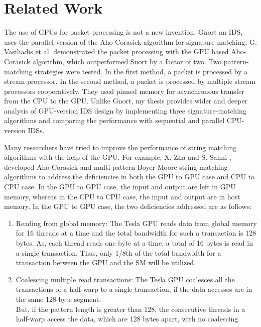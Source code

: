 \chapter{Related Work}

The use of GPUs for packet processing is not a new invention. Gnort \cite{bib10} an IDS, uses the parallel version of the Aho-Corasick algorithm \cite{bib6} for signature matching. G. Vasiliadis et al. \cite{bib10} demonstrated the packet processing with the GPU based Aho-Corasick algorithm, which outperformed Snort by a factor of two. Two pattern-matching strategies were tested. In the first method, a packet is processed by a stream processor. In the second method, a packet is processed by multiple stream processors cooperatively. They used pinned memory for asynchronous transfer from the CPU to the GPU. Unlike Gnort, my thesis provides wider and deeper analysis of GPU-version IDS design by implementing three signature-matching algorithms and comparing the performance with sequential and parallel CPU-version IDSs.

Many researchers have tried to improve the performance of string matching algorithms with the help of the GPU. For example, X. Zha and S. Sahni \cite{bib12}, developed Aho-Corasick and multi-pattern Boyer-Moore string matching algorithms to address the deficiencies in both the GPU to GPU case and CPU to CPU case. In the GPU to GPU case, the input and output are left in GPU memory, whereas in the CPU to CPU case, the input and output are in host memory. In the GPU to GPU case, the two deficiencies addressed are as follows:

\begin{enumerate}[leftmargin=*]
	\item
	Reading from global memory: The Tesla GPU reads data from global memory for 16 threads at a time and the total bandwidth for such a transaction is 128 bytes. As, each thread reads one byte at a time, a total of 16 bytes is read in a single transaction. Thus, only 1/8th of the total bandwidth for a transaction between the GPU and the SM will be utilized. 
	\item
	Coalescing multiple read transactions: The Tesla GPU coalesces all the transactions of a half-warp to a single transaction, if the data accesses are in the same 128-byte segment. \\But, if the pattern length is greater than 128, the consecutive threads in a half-warp access the data, which are 128 bytes apart, with no coalescing.
\end{enumerate}
\vspace{\topsep}

